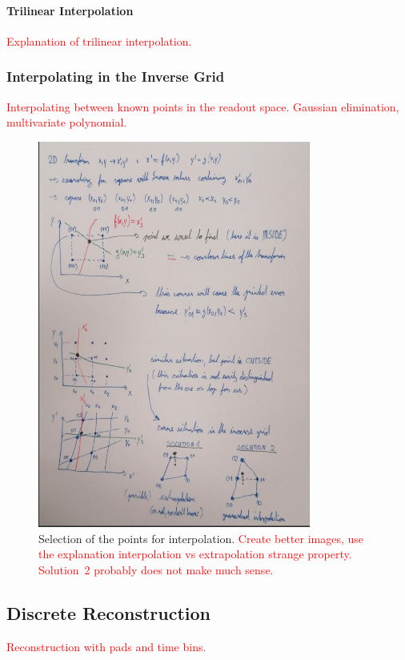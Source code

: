 \documentclass[]{article}
\begin{document}
				\paragraph{Trilinear Interpolation}
					\textcolor{red}{\newline Explanation of trilinear interpolation.}
					
			\subsubsection{Interpolating in the Inverse Grid}
				\textcolor{red}{Interpolating between known points in the readout space. Gaussian elimination, multivariate polynomial.}
				
				\begin{figure}
					\centering
					\includegraphics[width=0.8\textwidth]{interpol.png}
					\caption{Selection of the points for interpolation. \textcolor{red}{Create better images, use the explanation interpolation vs extrapolation strange property. Solution~2 probably does not make much sense.}}
					\label{fig:interpol}
				\end{figure}
		
		\subsection{Discrete Reconstruction}
			\textcolor{red}{Reconstruction with pads and time bins.}
			
\end{document}
